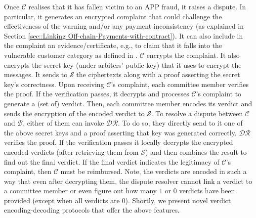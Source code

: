 

Once $\mathcal{C}$ realises that it has fallen victim to an APP fraud, it  raises a dispute. In particular, it  generates  an encrypted complaint that could  challenge the effectiveness of the warning and/or any payment inconsistency (as explained in Section \ref{sec::Linking Off-chain-Payments-with-contract}). It can also  include in the complaint an  evidence/certificate, e.g., to claim that it falls into  the vulnerable customer category as defined in \cite{CRM-code}. $\mathcal{C}$ encrypts the complaint. It also   encrypts the secret key (under arbiters' public key) that it uses to encrypt the messages. It sends to $\mathcal{S}$ the ciphertexts along with a proof asserting the secret key's correctness.  Upon receiving $\mathcal{C}$'s complaint, each committee member verifies the proof. If the verification passes, it decrypts and processes $\mathcal{C}$'s complaint to generate a (set of) verdict. Then, each committee member encodes its verdict and sends the  encryption of the encoded verdict to $\mathcal{S}$. To resolve a dispute between $\mathcal{C}$ and $\mathcal{B}$, either of them can  invoke $\mathcal{DR}$. To do so, they  directly send to it one of the above secret keys and a proof asserting that key was generated correctly.   $\mathcal{DR}$ verifies the proof. If the verification passes it locally decrypts the encrypted encoded verdicts (after retrieving them from $\mathcal{S}$) and then combines the result to find out the final verdict.  If the final verdict indicates the legitimacy of  $\mathcal{C}$'s complaint, then $\mathcal{C}$ must be reimbursed.   Note, the verdicts are encoded in such a way that even after decrypting them, the dispute resolver cannot link a verdict to a committee member or even figure out how many $1$ or $0$ verdicts have been provided  (except when all verdicts are $0$). Shortly, we present  novel verdict encoding-decoding protocols that offer the above features. 







